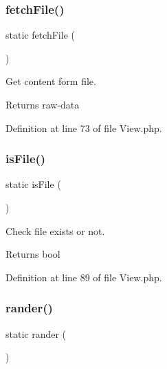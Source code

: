 \subsubsection{\texorpdfstring{fetch\+File()}{fetchFile()}}
{\footnotesize\ttfamily static fetch\+File (\begin{DoxyParamCaption}{ }\end{DoxyParamCaption})\hspace{0.3cm}{\ttfamily [static]}}

Get content form file.

\begin{DoxyReturn}{Returns}
raw-\/data 
\end{DoxyReturn}


Definition at line 73 of file View.\+php.

\mbox{\label{class_zest_1_1_view_1_1_view_a5114b9fecb007e9aa08c1d1669ecccac}} 
\subsubsection{\texorpdfstring{is\+File()}{isFile()}}
{\footnotesize\ttfamily static is\+File (\begin{DoxyParamCaption}{ }\end{DoxyParamCaption})\hspace{0.3cm}{\ttfamily [static]}}

Check file exists or not.

\begin{DoxyReturn}{Returns}
bool 
\end{DoxyReturn}


Definition at line 89 of file View.\+php.

\mbox{\label{class_zest_1_1_view_1_1_view_a169b39f53b8d8e35bd0c099da257322e}} 
\subsubsection{\texorpdfstring{rander()}{rander()}}
{\footnotesize\ttfamily static rander (\begin{DoxyParamCaption}{ }\end{DoxyParamCaption})\hspace{0.3cm}{\ttfamily [static]}}

